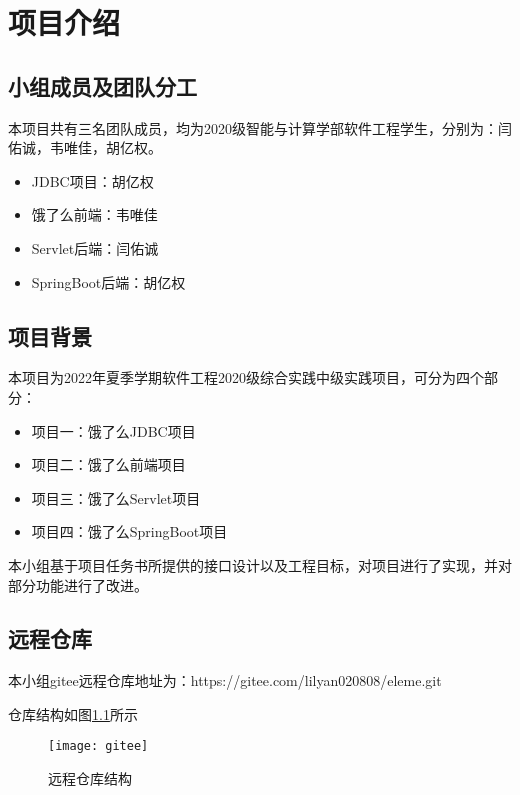 
\chapter{项目介绍}

\section{小组成员及团队分工}

本项目共有三名团队成员，均为2020级智能与计算学部软件工程学生，分别为：闫佑诚，韦唯佳，胡亿权。

\begin{itemize}
  \item{JDBC项目}：胡亿权
  \item{饿了么前端}：韦唯佳
  \item{Servlet后端}：闫佑诚
  \item{SpringBoot后端}：胡亿权
\end{itemize}

\section{项目背景}

本项目为2022年夏季学期软件工程2020级综合实践中级实践项目，可分为四个部分：

\begin{itemize}
  \item{项目一}：饿了么JDBC项目
  \item{项目二}：饿了么前端项目
  \item{项目三}：饿了么Servlet项目
  \item{项目四}：饿了么SpringBoot项目
\end{itemize}

本小组基于项目任务书所提供的接口设计以及工程目标，对项目进行了实现，并对部分功能进行了改进。

\section{远程仓库}

本小组gitee远程仓库地址为：https://gitee.com/lilyan020808/eleme.git

仓库结构如图\ref{fig:git}所示
\begin{figure}[htbp]
  \centering
  \texttt{[image: gitee]}
  \caption{远程仓库结构}\label{fig:git}
  \vspace{\baselineskip}
  \end{figure}
  
